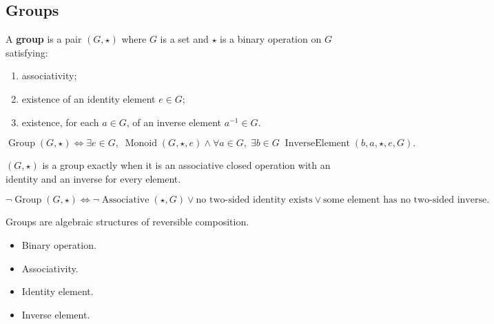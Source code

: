 \subsection{Groups}
\label{subsec:groups}

\begin{tcolorbox}[title={Definition --- Group}]
\begin{definition}[Group]
\label{def:group}
A \textbf{group} is a pair $(G,\star)$ where $G$ is a set and $\star$ is a
binary operation on $G$ satisfying:
\begin{enumerate}[label=\textbf{G\arabic*.}]
  \item associativity;
  \item existence of an identity element $e\in G$;
  \item existence, for each $a\in G$, of an inverse element $a^{-1}\in G$.
\end{enumerate}
\end{definition}
\end{tcolorbox}

\begin{remark*}
\[
\operatorname{Group}(G,\star)
\Longleftrightarrow
\exists e\in G,\;
\operatorname{Monoid}(G,\star,e)
\land
\forall a\in G,\;\exists b\in G\;
\operatorname{InverseElement}(b,a,\star,e,G).
\]
\end{remark*}

\begin{remark*}
$(G,\star)$ is a group exactly when it is an associative closed operation with
an identity and an inverse for every element.
\end{remark*}

\begin{remark*}
\[
\neg\operatorname{Group}(G,\star)
\Longleftrightarrow
\neg\operatorname{Associative}(\star,G)
\lor
\text{no two-sided identity exists}
\lor
\text{some element has no two-sided inverse}.
\]
\end{remark*}

\begin{remark*}[Interpretation]
Groups are algebraic structures of reversible composition.
\end{remark*}

\begin{remark*}[Dependencies]
\begin{itemize}
  \item Binary operation.
  \item Associativity.
  \item Identity element.
  \item Inverse element.
\end{itemize}
\end{remark*}

